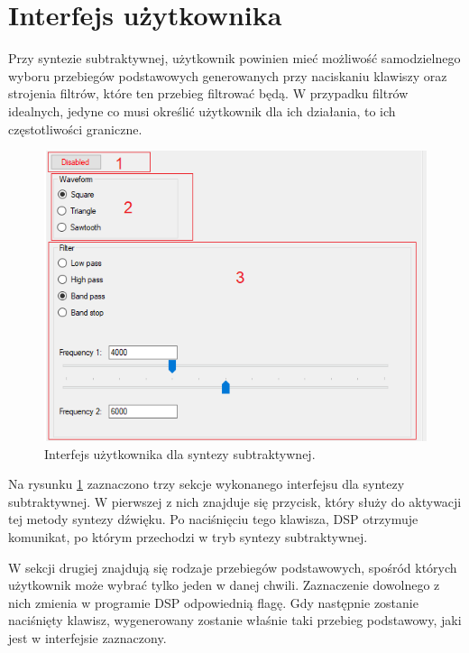 \section{Interfejs użytkownika}
Przy syntezie subtraktywnej, użytkownik powinien mieć możliwość samodzielnego wyboru przebiegów podstawowych generowanych przy naciskaniu klawiszy oraz strojenia filtrów, które ten przebieg filtrować będą. W przypadku filtrów idealnych, jedyne co musi określić użytkownik dla ich działania, to ich częstotliwości graniczne.
\begin{figure}[H]
	\centering
	\includegraphics[width=12cm]{grafiki/sub_interface}
	\captionsetup{justification=centering}
	\caption{Interfejs użytkownika dla syntezy subtraktywnej.}
	\label{rys:sub_interface}
\end{figure}
Na rysunku \ref{rys:sub_interface} zaznaczono trzy sekcje wykonanego interfejsu dla syntezy subtraktywnej. W pierwszej z nich znajduje się przycisk, który służy do aktywacji tej metody syntezy dźwięku. Po naciśnięciu tego klawisza, DSP otrzymuje komunikat, po którym przechodzi w tryb syntezy subtraktywnej.

W sekcji drugiej znajdują się rodzaje przebiegów podstawowych, spośród których użytkownik może wybrać tylko jeden w danej chwili. Zaznaczenie dowolnego z nich zmienia w programie DSP odpowiednią flagę. Gdy następnie zostanie naciśnięty klawisz, wygenerowany zostanie właśnie taki przebieg podstawowy, jaki jest w interfejsie zaznaczony.

